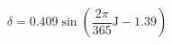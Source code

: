 \documentclass[12pt]{article}
\begin{document}
\begin{displaymath}
\delta=0.409 \sin \left(\frac{2 \pi}{365} \mathrm{J}-1.39\right)
\end{displaymath}
\end{document}
